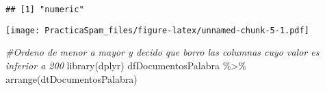 \documentclass[
]{article}
\newenvironment{Shaded}{\begin{snugshade}}{\end{snugshade}}
\newcommand{\CommentTok}[1]{\textcolor[rgb]{0.56,0.35,0.01}{\textit{#1}}}
\newcommand{\FunctionTok}[1]{\textcolor[rgb]{0.00,0.00,0.00}{#1}}
\newcommand{\NormalTok}[1]{#1}
\newcommand{\OtherTok}[1]{\textcolor[rgb]{0.56,0.35,0.01}{#1}}
\newcommand{\SpecialCharTok}[1]{\textcolor[rgb]{0.00,0.00,0.00}{#1}}
\begin{document}
\begin{verbatim}
## [1] "numeric"
\end{verbatim}

\begin{Shaded}
\end{Shaded}

\texttt{[image: PracticaSpam\_files/figure-latex/unnamed-chunk-5-1.pdf]}

\begin{Shaded}
\begin{Highlighting}[]
  \CommentTok{\#Ordeno de menor a mayor y decido que borro las columnas cuyo valor es inferior a 200}
  \FunctionTok{library}\NormalTok{(dplyr)}
\NormalTok{  dfDocumentosPalabra }\SpecialCharTok{\%\textgreater{}\%} \FunctionTok{arrange}\NormalTok{(dtDocumentosPalabra)}
\end{Highlighting}
\end{Shaded}
\end{document}
